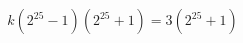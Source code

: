 \documentclass[preview]{standalone}
\begin{document}
\begin{align*}
k (2^{25} - 1)(2^{25} + 1) = 3(2^{25} + 1)
\end{align*}
\end{document}
